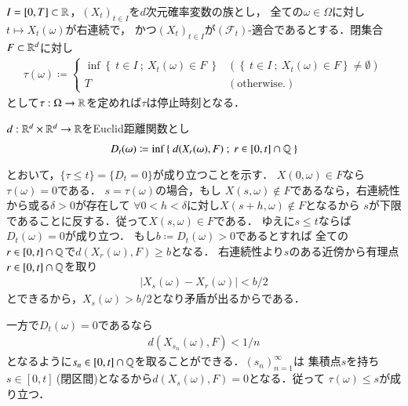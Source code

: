 	
	\begin{itembox}[l]{}
		\begin{thm}[閉集合と停止時刻]
			$I = [0,T] \subset \mathbb{R}$，$(X_t)_{t \in I}$を$d$次元確率変数の族とし，
			全ての$\omega \in \Omega$に対し$t \longmapsto X_t(\omega)$が右連続で，
			かつ$(X_t)_{t \in I}$が$(\mathcal{F}_t)$-適合であるとする．閉集合$F \subset \mathbb{R}^d$に対し
			\begin{align}
				\tau(\omega) \coloneqq
				\begin{cases}
					\inf{}{\left\{\ t \in I\ ;\ X_t(\omega) \in F\ \right\}} & (\left\{\ t \in I\ ;\ X_t(\omega) \in F \right\} \neq \emptyset)\\
					T & (\mathrm{otherwise.})
				\end{cases}
			\end{align}
			として$\tau:\Omega \rightarrow \mathbb{R}$を定めれば$\tau$は停止時刻となる．
		\end{thm}
	\end{itembox}
	
	\begin{prf}
		$d:\mathbb{R}^d \times \mathbb{R}^d \rightarrow \mathbb{R}$をEuclid距離関数とし
		\begin{align}
			D_t(\omega) \coloneqq \operatorname*{inf}_{} \left\{\ d(X_r(\omega),F)\ ;\ r \in [0,t] \cap \mathbb{Q}\ \right\}
		\end{align}
		とおいて，$\{ \tau \leq t \} = \{ D_t = 0 \}$が成り立つことを示す． 
		$X(0,\omega) \in F$なら$\tau(\omega) = 0$である．
		$s = \tau(\omega)$の場合，もし
		$X(s,\omega) \notin F$であるなら，右連続性から或る$\delta > 0$が存在して
		$\forall 0 < h < \delta$に対し$X(s+h,\omega) \notin F$となるから
		$s$が下限であることに反する．従って$X(s,\omega) \in F$である．
		ゆえに$s \leq t$ならば$D_t(\omega) = 0$が成り立つ．
		もし$b \coloneqq D_t(\omega) > 0$であるとすれば
		全ての$r \in [0,t] \cap \mathbb{Q}$で$d(X_r(\omega),F) \geq b$となる．
		右連続性より$s$のある近傍から有理点$r \in [0,t] \cap \mathbb{Q}$を取り
		\begin{align}
			|X_s(\omega) - X_r(\omega)| < b/2
		\end{align}
		とできるから，$X_s(\omega) > b/2$となり矛盾が出るからである．
		
		一方で$D_t(\omega) = 0$であるなら
		\begin{align}
			d(X_{s_n}(\omega),F) < 1/n
		\end{align}
		となるように$s_n \in [0,t] \cap \mathbb{Q}$を取ることができる．$(s_n)_{n=1}^{\infty}$は
		集積点$s$を持ち$s \in [0,t]\ $(閉区間)となるから$d(X_s(\omega),F)=0$となる．従って
		$\tau(\omega) \leq s$が成り立つ．
		\QED
	\end{prf}